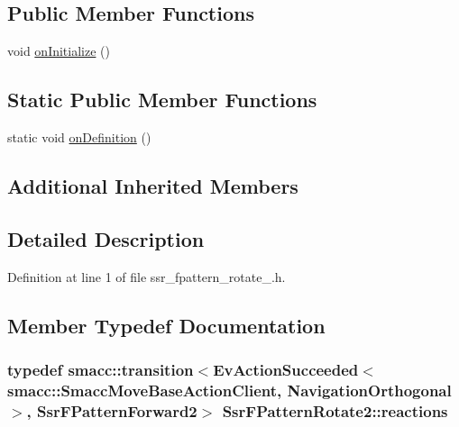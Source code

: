 \subsection*{Public Member Functions}
\begin{DoxyCompactItemize}
\item 
void \hyperlink{structSsrFPatternRotate2_af062537a9565259e197c1241c9c9d9b0}{on\+Initialize} ()
\end{DoxyCompactItemize}
\subsection*{Static Public Member Functions}
\begin{DoxyCompactItemize}
\item 
static void \hyperlink{structSsrFPatternRotate2_a4140f75a6189da0833fd5e6100c5193d}{on\+Definition} ()
\end{DoxyCompactItemize}
\subsection*{Additional Inherited Members}


\subsection{Detailed Description}


Definition at line 1 of file ssr\+\_\+fpattern\+\_\+rotate\+\_.\+h.



\subsection{Member Typedef Documentation}
\subsubsection[{\texorpdfstring{reactions}{reactions}}]{\setlength{\rightskip}{0pt plus 5cm}typedef {\bf smacc\+::transition}$<$Ev\+Action\+Succeeded$<${\bf smacc\+::\+Smacc\+Move\+Base\+Action\+Client}, {\bf Navigation\+Orthogonal}$>$, {\bf Ssr\+F\+Pattern\+Forward2}$>$ {\bf Ssr\+F\+Pattern\+Rotate2\+::reactions}}\hypertarget{structSsrFPatternRotate2_abd351e2ecdac7b34778f5b4e9fbeda9b}{}\label{structSsrFPatternRotate2_abd351e2ecdac7b34778f5b4e9fbeda9b}


